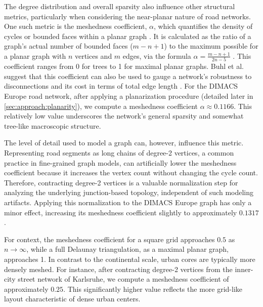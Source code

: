 The degree distribution and overall sparsity also influence other structural metrics, particularly when considering the near-planar nature of road networks.
One such metric is the meshedness coefficient, \(\alpha\), which quantifies the density of cycles or bounded faces within a planar graph \cite{buhl_topological_2006}.
It is calculated as the ratio of a graph's actual number of bounded faces (\(m - n + 1\)) to the maximum possible for a planar graph with \(n\) vertices and \(m\) edges, via the formula \(\alpha = \frac{m - n + 1}{2n - 5}\) \cite{buhl_topological_2006}.
This coefficient ranges from 0 for trees to 1 for maximal planar graphs.
Buhl et al. suggest that this coefficient can also be used to gauge a network's robustness to disconnections and its cost in terms of total edge length \cite{buhl_topological_2006}.
For the DIMACS Europe road network, after applying a planarization procedure (detailed later in \cref{sec:approach:planarity}), we compute a meshedness coefficient \(\alpha \approx 0.1166\).
This relatively low value underscores the network's general sparsity and somewhat tree-like macroscopic structure.

The level of detail used to model a graph can, however, influence this metric.
Representing road segments as long chains of degree-2 vertices, a common practice in fine-grained graph models, can artificially lower the meshedness coefficient because it increases the vertex count without changing the cycle count.
Therefore, contracting degree-2 vertices is a valuable normalization step for analyzing the underlying junction-based topology, independent of such modeling artifacts.
Applying this normalization to the DIMACS Europe graph has only a minor effect, increasing its meshedness coefficient slightly to approximately \(0.1317\).

For context, the meshedness coefficient for a square grid approaches \(0.5\) as \(n \to \infty\), while a full Delaunay triangulation, as a maximal planar graph, approaches 1.
In contrast to the continental scale, urban cores are typically more densely meshed.
For instance, after contracting degree-2 vertices from the inner-city street network of Karlsruhe, we compute a meshedness coefficient of approximately \(0.25\).
This significantly higher value reflects the more grid-like layout characteristic of dense urban centers.

























